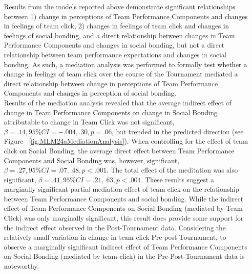 \begin{CJK}{UTF8}{gbsn}

  Results from the models reported above demonstrate significant relationships between 1) change in perceptions of Team Performance Components and changes in feelings of team click, 2) changes in feelings of team click and changes in feelings of social bonding, and a direct relationship between changes in Team Performance Components and changes in social bonding, but not a direct relationship between team performance expectations and changes in social bonding. As such, a mediation analysis was performed to formally test whether a change in feelings of team click over the course of the Tournament mediated a direct relationship between change in perceptions of Team Performance Components and changes in perception of social bonding.\\

  Results of the mediation analysis revealed that the average indirect effect of change in Team Performance Components on change in Social Bonding attributable to change in Team Click was not significant, $\beta = .14, 95\% CI = -.004 , .30, p = .06$, but trended in the predicted direction (see Figure ~\ref{fig:MLM24aMediationAnalysis}).  When controlling for the effect of team click on Social Bonding, the average direct effect between Team Performance Components and Social Bonding was, however, significant, $\beta = .27, 95\% CI = .07 , .48, p < .001$.  The total effect of the meditation was also significant, $\beta = .41, 95\% CI = .21 , .63, p < .001$.  These results suggest a marginally-significant partial mediation effect of team click on the relationship between Team Performance Components and social bonding.  While the indirect effect of Team Performance Components on Social Bonding (mediated by Team Click) was only marginally significant, this result does provide some support for the indirect effect observed in the Post-Tournament data.  Considering the relatively small variation in change in team-click Pre-post Tournament, to observe a marginally significant indirect effect of Team Performance Components on Social Bonding (mediated by team-click) in the Pre-Post-Tournament data is noteworthy.



\end{CJK}
